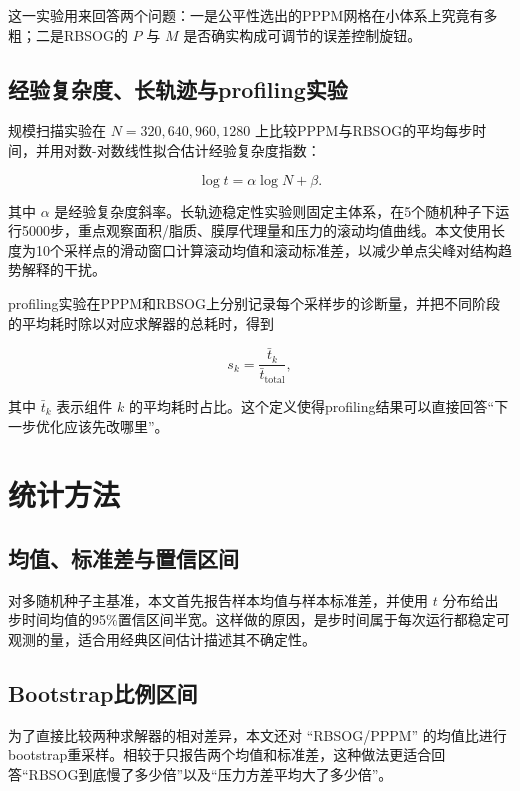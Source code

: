这一实验用来回答两个问题：一是公平性选出的PPPM网格在小体系上究竟有多粗；二是RBSOG的 $P$ 与 $M$ 是否确实构成可调节的误差控制旋钮。

\subsection{经验复杂度、长轨迹与profiling实验}

规模扫描实验在 $N=320,640,960,1280$ 上比较PPPM与RBSOG的平均每步时间，并用对数-对数线性拟合估计经验复杂度指数：

\begin{equation}
\log t = \alpha \log N + \beta.
\label{eq:method_loglog}
\end{equation}

其中 $\alpha$ 是经验复杂度斜率。长轨迹稳定性实验则固定主体系，在5个随机种子下运行5000步，重点观察面积/脂质、膜厚代理量和压力的滚动均值曲线。本文使用长度为10个采样点的滑动窗口计算滚动均值和滚动标准差，以减少单点尖峰对结构趋势解释的干扰。

profiling实验在PPPM和RBSOG上分别记录每个采样步的诊断量，并把不同阶段的平均耗时除以对应求解器的总耗时，得到

\begin{equation}
s_k = \frac{\bar t_k}{\bar t_{\mathrm{total}}},
\label{eq:method_profile_share}
\end{equation}

其中 $\bar t_k$ 表示组件 $k$ 的平均耗时占比。这个定义使得profiling结果可以直接回答“下一步优化应该先改哪里”。

\section{统计方法}

\subsection{均值、标准差与置信区间}

对多随机种子主基准，本文首先报告样本均值与样本标准差，并使用 $t$ 分布给出步时间均值的95\%置信区间半宽。这样做的原因，是步时间属于每次运行都稳定可观测的量，适合用经典区间估计描述其不确定性。

\subsection{Bootstrap比例区间}

为了直接比较两种求解器的相对差异，本文还对 “RBSOG/PPPM” 的均值比进行bootstrap重采样。相较于只报告两个均值和标准差，这种做法更适合回答“RBSOG到底慢了多少倍”以及“压力方差平均大了多少倍”。

